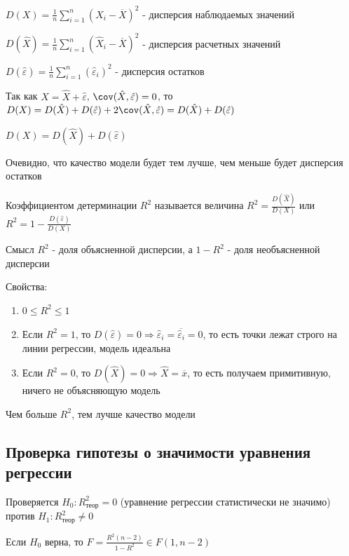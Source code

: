 \documentclass[12pt]{article}
\begin{document}
\Def $D(X) = \frac{1}{n} \sum_{i = 1}^n (X_i - \overline{X})^2$ - дисперсия наблюдаемых значений

\Defs $D(\hat X) = \frac{1}{n} \sum_{i = 1}^n (\hat X_i - \overline{X})^2$ - дисперсия расчетных значений

\Defs $D(\hat \varepsilon) = \frac{1}{n} \sum_{i = 1}^n (\hat \varepsilon_i)^2$ - дисперсия остатков

Так как $X = \hat X + \hat \varepsilon$, $\cov (\hat X, \hat \varepsilon) = 0$, то $D(X) = D(\hat X) + D(\hat \varepsilon) + 2\cov (\hat X, \hat \varepsilon) = D(\hat X) + D(\hat \varepsilon)$

\begin{MyTheorem}
    \Ths $D(X) = D(\hat X) + D(\hat \varepsilon)$
\end{MyTheorem}

Очевидно, что качество модели будет тем лучше, чем меньше будет дисперсия остатков

\Def Коэффициентом детерминации $R^2$ называется величина $R^2 = \frac{D(\hat X)}{D(X)}$ или $R^2 = 1 - \frac{D(\hat \varepsilon)}{D(X)}$

\Notas Смысл $R^2$ - доля объясненной дисперсии, а $1 - R^2$ - доля необъясненной дисперсии

Свойства: 

\begin{enumerate}
    \item $0 \leq R^2 \leq 1$
    \item Если $R^2 = 1$, то $D(\hat \varepsilon) = 0 \Longrightarrow \hat \varepsilon_i = \overline{\hat \varepsilon_i} = 0$, то есть точки лежат строго на 
    линии регрессии, модель идеальна

    \item Если $R^2 = 0$, то $D(\hat X) = 0 \Longrightarrow \hat X = \overline{x}$, то есть получаем примитивную, ничего не объясняющую модель
\end{enumerate}

Чем больше $R^2$, тем лучше качество модели

\subsection{Проверка гипотезы о значимости уравнения регрессии}

Проверяется $H_0 : R^2_\text{теор} = 0$ (уравнение регрессии статистически не значимо) против $H_1 : R^2_\text{теор} \neq 0$

\begin{MyTheorem}
    \Ths Если $H_0$ верна, то $F = \frac{R^2 (n - 2)}{1 - R^2} \in F(1, n - 2)$
\end{MyTheorem}
\end{document}
